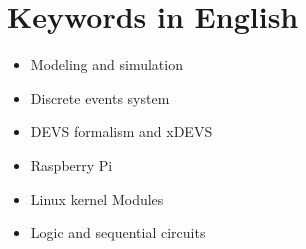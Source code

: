 \documentclass[a4paper,11pt]{book}
\begin{document}
\section*{Keywords in English}
\begin{itemize}
\item Modeling and simulation
\item Discrete events system
\item DEVS formalism and xDEVS
\item Raspberry Pi
\item Linux kernel Modules
\item Logic and sequential circuits
\end{itemize}
















\end{document}
